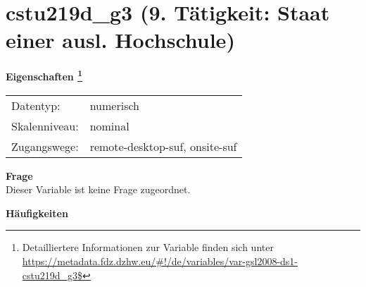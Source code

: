 
    \setcounter{footnote}{0}

    \vspace*{-1.8cm}
	\section{cstu219d\_g3 (9. Tätigkeit: Staat einer ausl. Hochschule)}
	\label{section:cstu219d_g3}



    \vspace*{0.5cm}
    \noindent\textbf{Eigenschaften
	\footnote{Detailliertere Informationen zur Variable finden sich unter
		\url{https://metadata.fdz.dzhw.eu/\#!/de/variables/var-gsl2008-ds1-cstu219d_g3$}}}\\
	\begin{tabularx}{\hsize}{@{}lX}
	Datentyp: & numerisch \\
	Skalenniveau: & nominal \\
	Zugangswege: &
	  remote-desktop-suf, 
	  onsite-suf
 \\
    \end{tabularx}



		\vspace*{0.5cm}
		\noindent\textbf{Frage}\\
		Dieser Variable ist keine Frage zugeordnet.





        		\vspace*{0.5cm}
                \noindent\textbf{Häufigkeiten}

